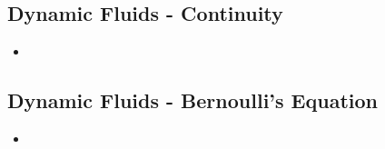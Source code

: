 \subsection{Dynamic Fluids - Continuity}
\begin{itemize}
    \item 
\end{itemize}

\subsection{Dynamic Fluids - Bernoulli's Equation}
\begin{itemize}
    \item 
\end{itemize}
